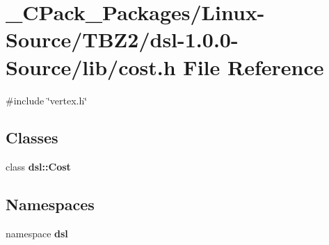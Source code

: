 \section{\_\-CPack\_\-Packages/Linux-\/Source/TBZ2/dsl-\/1.0.0-\/Source/lib/cost.h File Reference}
\label{__CPack__Packages_2Linux-Source_2TBZ2_2dsl-1_80_80-Source_2lib_2cost_8h}
{\ttfamily \#include \char`\"{}vertex.h\char`\"{}}\par
\subsection*{Classes}
\begin{DoxyCompactItemize}
\item 
class {\bf dsl::Cost}
\end{DoxyCompactItemize}
\subsection*{Namespaces}
\begin{DoxyCompactItemize}
\item 
namespace {\bf dsl}
\end{DoxyCompactItemize}
